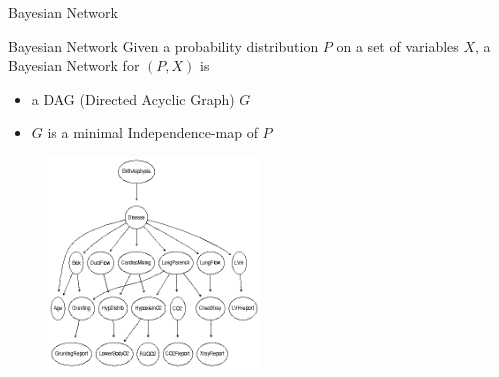 \documentclass[10pt]{beamer} %
\begin{document}
\begin{frame}[plain]{Bayesian Network}

{\begin{block}{Bayesian Network}
Given a probability distribution $P$ on a set of variables $X$, a Bayesian Network for $(P,X)$ is
\begin{itemize}
\item a DAG (Directed Acyclic Graph) $G$
\item $G$ is a minimal Independence-map of $P$
\end{itemize}
\end{block}}

\begin{figure}
\includegraphics[width = 0.5\textwidth]{images/BNexample.png}
\end{figure}
\end{frame}
\end{document}
